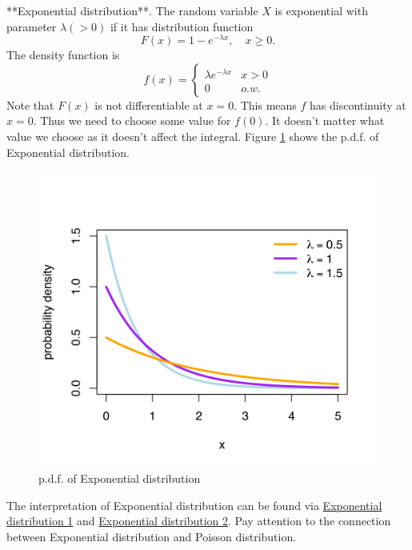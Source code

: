 \begin{example}
**Exponential distribution**. The random variable $X$ is exponential with parameter $\lambda(> 0)$ if it has distribution function 
\begin{equation*}
    F(x) = 1 - e^{-\lambda x}, \quad x \geq 0.
\end{equation*}
The density function is
\begin{equation*}
    f(x) = \begin{cases} \lambda e^{-\lambda x} & x > 0 \\ 0 & o.w.
    \end{cases}
\end{equation*}
Note that $F(x)$ is not differentiable at $x=0$. This means $f$ has discontinuity at $x=0$. Thus we need to choose some value for $f(0)$. It doesn't matter what value we choose as it doesn't affect the integral. Figure \ref{fig:exponential} shows the p.d.f. of Exponential distribution.
\begin{figure}[!htb]
    \centering
    \includegraphics[scale=0.25]{plots/exponential.png}
    \caption{p.d.f. of Exponential distribution}
    \label{fig:exponential}
\end{figure}

\begin{remark}
The interpretation of Exponential distribution can be found via \href{https://www.probabilitycourse.com/chapter4/4_2_2_exponential.php}{Exponential distribution 1} and \href{https://www.statlect.com/probability-distributions/exponential-distribution}{Exponential distribution 2}. Pay attention to the connection between Exponential distribution and Poisson distribution.
\end{remark}
\end{example}

